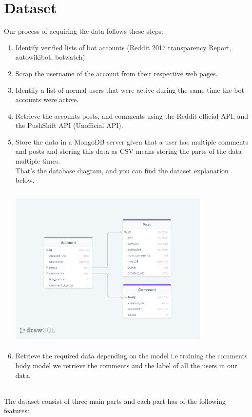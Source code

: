 \documentclass{article}
\begin{document}
\section{Dataset}
Our process of acquiring the data follows these steps:
    \begin{enumerate}
        \item Identify verified lists of bot accounts (Reddit 2017 transparency Report, autowikibot, botwatch)
        \item Scrap the username of the account from their respective web pages.
        \item Identify a list of normal users that were active during the same time the bot accounts were active.
        \item Retrieve the accounts posts, and comments using the Reddit official API, and the PushShift API (Unofficial API).
        \item Store the data in a MongoDB server given that a user has multiple comments and posts and storing this data as CSV means storing the parts of the data multiple times.\\
        That's the database diagram, and you can find the dataset explanation below.\\ \\
            \includegraphics[width=10cm, height=8cm]{db}\\
        \item Retrieve the required data depending on the model i.e training the comments body model we retrieve the comments and the label of all the users in our data. \\ \\
    \end{enumerate}
The dataset consist of three main parts and each part has of the following features:
\end{document}
